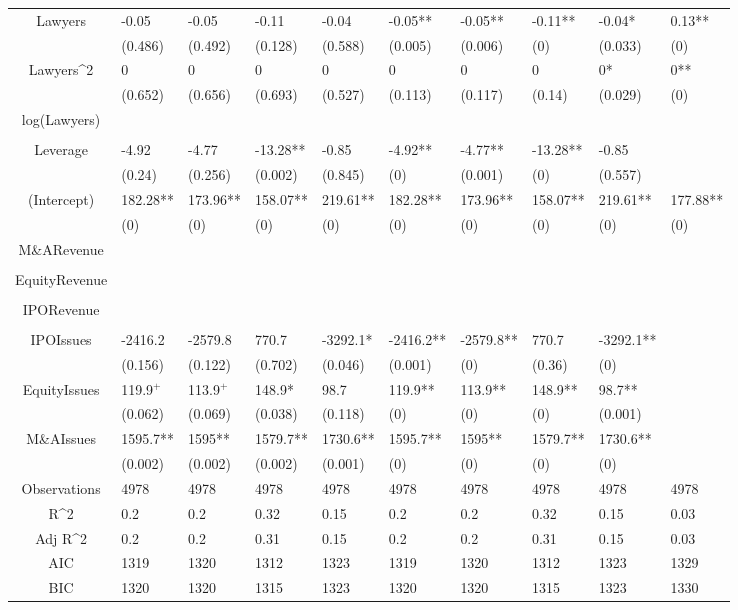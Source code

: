 \documentclass{article}
\begin{document}
\begin{table}[H]
\begin{tabular}{|clllllllll|}
Lawyers & -0.05 & -0.05 & -0.11 & -0.04 & -0.05** & -0.05** & -0.11** & -0.04* & 0.13** \\ 
   & (0.486) & (0.492) & (0.128) & (0.588) & (0.005) & (0.006) & (0) & (0.033) & (0) \\ 
  Lawyers^2 & 0 & 0 & 0 & 0 & 0 & 0 & 0 & 0* & 0** \\ 
   & (0.652) & (0.656) & (0.693) & (0.527) & (0.113) & (0.117) & (0.14) & (0.029) & (0) \\ 
  log(Lawyers) &  &  &  &  &  &  &  &  &  \\ 
   &  &  &  &  &  &  &  &  &  \\ 
  Leverage & -4.92 & -4.77 & -13.28** & -0.85 & -4.92** & -4.77** & -13.28** & -0.85 &  \\ 
   & (0.24) & (0.256) & (0.002) & (0.845) & (0) & (0.001) & (0) & (0.557) &  \\ 
  (Intercept) & 182.28** & 173.96** & 158.07** & 219.61** & 182.28** & 173.96** & 158.07** & 219.61** & 177.88** \\ 
   & (0) & (0) & (0) & (0) & (0) & (0) & (0) & (0) & (0) \\ 
  M\&ARevenue &  &  &  &  &  &  &  &  &  \\ 
   &  &  &  &  &  &  &  &  &  \\ 
  EquityRevenue &  &  &  &  &  &  &  &  &  \\ 
   &  &  &  &  &  &  &  &  &  \\ 
  IPORevenue &  &  &  &  &  &  &  &  &  \\ 
   &  &  &  &  &  &  &  &  &  \\ 
  IPOIssues & -2416.2 & -2579.8 & 770.7 & -3292.1* & -2416.2** & -2579.8** & 770.7 & -3292.1** &  \\ 
   & (0.156) & (0.122) & (0.702) & (0.046) & (0.001) & (0) & (0.36) & (0) &  \\ 
  EquityIssues & 119.9$^{+}$ & 113.9$^{+}$ & 148.9* & 98.7 & 119.9** & 113.9** & 148.9** & 98.7** &  \\ 
   & (0.062) & (0.069) & (0.038) & (0.118) & (0) & (0) & (0) & (0.001) &  \\ 
  M\&AIssues & 1595.7** & 1595** & 1579.7** & 1730.6** & 1595.7** & 1595** & 1579.7** & 1730.6** &  \\ 
   & (0.002) & (0.002) & (0.002) & (0.001) & (0) & (0) & (0) & (0) &  \\ 
  \hline 
 Observations & 4978 & 4978 & 4978 & 4978 & 4978 & 4978 & 4978 & 4978 & 4978 \\ 
  R^2 & 0.2 & 0.2 & 0.32 & 0.15 & 0.2 & 0.2 & 0.32 & 0.15 & 0.03 \\ 
  Adj R^2 & 0.2 & 0.2 & 0.31 & 0.15 & 0.2 & 0.2 & 0.31 & 0.15 & 0.03 \\ 
  AIC & 1319 & 1320 & 1312 & 1323 & 1319 & 1320 & 1312 & 1323 & 1329 \\ 
  BIC & 1320 & 1320 & 1315 & 1323 & 1320 & 1320 & 1315 & 1323 & 1330 \\ 
   \hline
\end{tabular}
 
\end{table}
\end{document}
